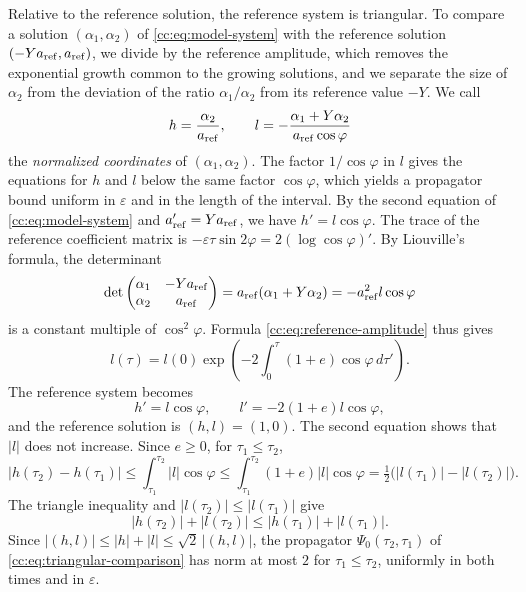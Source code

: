 Relative to the reference solution, the reference system is triangular.
To compare a solution $(\alpha_1,\alpha_2)$ of
\eqref{cc:eq:model-system} with the reference solution
$(-Ya_{\rm ref},a_{\rm ref})$, we divide by the reference amplitude,
which removes the exponential growth common to the growing solutions,
and we separate the size of $\alpha_2$ from the deviation of the ratio
$\alpha_1/\alpha_2$ from its reference value $-Y$. We call
\begin{equation}\label{cc:eq:normalized}
 h=\frac{\alpha_2}{a_{\rm ref}},\qquad
 l=-\frac{\alpha_1+Y\alpha_2}{a_{\rm ref}\cos\varphi}
\end{equation}
the \emph{normalized coordinates} of $(\alpha_1,\alpha_2)$. The factor
$1/\cos\varphi$ in $l$ gives the equations for $h$ and $l$ below the
same factor $\cos\varphi$, which yields a propagator bound uniform in
$\varepsilon$ and in the length of the interval. By the second
equation of \eqref{cc:eq:model-system} and $a_{\rm ref}'=Ya_{\rm ref}$,
we have $h'=l\cos\varphi$. The trace of the reference coefficient matrix
is $-\varepsilon\tau\sin2\varphi=2(\log\cos\varphi)'$. By Liouville's
formula, the determinant
\[
 \det\begin{pmatrix}\alpha_1&-Ya_{\rm ref}\\
                      \alpha_2&a_{\rm ref}\end{pmatrix}
 =a_{\rm ref}(\alpha_1+Y\alpha_2)=-a_{\rm ref}^2l\cos\varphi
\]
is a constant multiple of $\cos^2\varphi$. Formula
\eqref{cc:eq:reference-amplitude} thus gives
\[
 l(\tau)=l(0)\exp\left(-2\int_0^\tau(1+e)\cos\varphi\,d\tau'\right).
\]
The reference system becomes
\begin{equation}\label{cc:eq:triangular-comparison}
 h'=l\cos\varphi,\qquad l'=-2(1+e)l\cos\varphi,
\end{equation}
and the reference solution is $(h,l)=(1,0)$. The second equation shows
that $|l|$ does not increase. Since $e\ge0$, for $\tau_1\le\tau_2$,
\[
 |h(\tau_2)-h(\tau_1)|\le\int_{\tau_1}^{\tau_2}|l|\cos\varphi
 \le\int_{\tau_1}^{\tau_2}(1+e)|l|\cos\varphi
 =\tfrac12\bigl(|l(\tau_1)|-|l(\tau_2)|\bigr).
\]
The triangle inequality and $|l(\tau_2)|\le|l(\tau_1)|$ give
\[
 |h(\tau_2)|+|l(\tau_2)|\le|h(\tau_1)|+|l(\tau_1)|.
\]
Since $|(h,l)|\le|h|+|l|\le\sqrt2\,|(h,l)|$, the propagator
$\Psi_0(\tau_2,\tau_1)$ of \eqref{cc:eq:triangular-comparison} has norm
at most $2$ for $\tau_1\le\tau_2$, uniformly in both times and in
$\varepsilon$.

